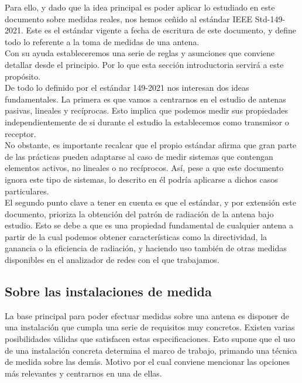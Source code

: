\documentclass{article}
\begin{document}
Para ello, y dado que la idea principal es poder aplicar lo estudiado en este documento sobre medidas reales, nos hemos ceñido al estándar IEEE Std-149-2021. Este es el estándar vigente a fecha de escritura de este
documento, y define todo lo referente a la toma de medidas de una antena.\\
Con su ayuda estableceremos una serie de reglas y asunciones que conviene detallar desde el principio. Por lo que esta sección introductoria servirá a este propósito.
\\

De todo lo definido por el estándar 149-2021 \autocite{IEEEstd} nos interesan dos ideas fundamentales. La primera es que vamos a centrarnos en el estudio de antenas pasivas, lineales y recíprocas. Esto implica que podemos medir sus propiedades independientemente de si durante el estudio la establecemos como transmisor o receptor.
\\

No obstante, es importante recalcar que el propio estándar afirma que gran parte de las prácticas pueden adaptarse al caso de medir sistemas que contengan elementos activos, no lineales o no recíprocos. Así, pese a que este documento ignora este tipo de sistemas, lo descrito en él podría aplicarse a dichos casos particulares.
\\
El segundo punto clave a tener en cuenta es que el estándar, y por extensión este documento, prioriza la obtención del patrón de radiación de la antena bajo estudio. Esto se debe a que es una propiedad fundamental de cualquier antena a partir de la cual podemos obtener características como la directividad, la ganancia o la eficiencia de radiación, y haciendo uso también de otras medidas disponibles en el analizador de redes con el que trabajamos.
\\
\newpage
\subsection{Sobre las instalaciones de medida}

La base principal para poder efectuar medidas sobre una antena es disponer de una instalación que cumpla una serie de requisitos muy concretos. Existen varias posibilidades válidas que satisfacen estas especificaciones. 
Esto supone que el uso de una instalación concreta determina el marco de trabajo, primando una técnica de medida sobre las demás. Motivo por el cual conviene mencionar las opciones más relevantes y centrarnos en una de ellas. 
\\
\end{document}
